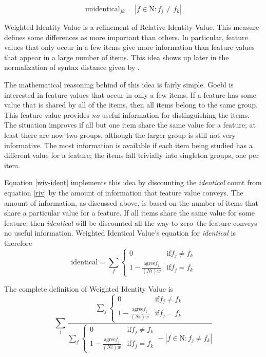 \documentclass[11pt]{article}
\begin{document}
\begin{equation}
  \textrm{unidentical}_{jk} = |f \in \textrm{N} : f_j \neq f_k|
\end{equation}

Weighted Identity Value is a refinement of Relative Identity
Value. This measure defines some differences as more
important than others. In particular, feature values that only occur
in a few items give more information than feature values that appear
in a large number of items. This
idea shows up later in the normalization of syntax distance given by
.

The mathematical reasoning behind of this idea is fairly simple. Goebl
is interested in feature values that occur in only a few items. If a
feature has some value that is shared by all of the items, then all
items belong to the same group. This feature value provides {\it no}
useful information for distinguishing the items.  The situation
improves if all but one item share the same value for a feature; at
least there are now two groups, although the larger group is still not
very informative.  The most information is available if each item
being studied has a different value for a feature; the items fall
trivially into singleton groups, one per item.

Equation \ref{wiv-ident} implements this idea by discounting
the \textit{identical} count from equation \ref{riv} by
the amount of information that feature value conveys. The
amount of information, as discussed above, is based on the number of
items that share a particular value for a feature. If all items share
the same value for some feature, then \textit{identical} will be discounted all the
way to zero--the feature conveys no useful information.
Weighted Identical Value's equation for \textit{identical} is
therefore
\begin{equation}
  \textrm{identical} = \sum_f \left\{
  \begin{array}{ll}
    0 & \textrm{if} f_j \neq f_k \\
    1 - \frac{\textrm{agree}f_{j}}{(Ni)w} & \textrm{if} f_j = f_k
  \end{array} \right.
\label{wiv-ident}
\end{equation}

\noindent{}The complete definition of Weighted Identity Value is
\begin{equation} \sum_i \frac{\sum_f \left\{
  \begin{array}{ll}
    0 & \textrm{if} f_j \neq f_k \\
    1 - \frac{\textrm{agree}f_j} {(Ni)w} & \textrm{if} f_j = f_k
\end{array} \right.}
  {\sum_f \left\{
  \begin{array}{ll}
    0 & \textrm{if} f_j \neq f_k \\
    1 - \frac{\textrm{agree}f_j} {(Ni)w} & \textrm{if} f_j = f_k
    \end{array} \right. - |f \in \textrm{N} : f_j \neq f_k|}
  \label{wiv-full}
  \end{equation}
\end{document}
